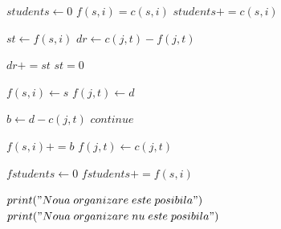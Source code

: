 \documentclass[11pt,leqno]{article}
\begin{document}
\pagebreak

\vspace{0.5cm}
\begin{algorithmic}
    \State $students \gets 0$
        \State $f(s, i) = c(s, i)$
        \State $students += c(s, i)$
    \EndFor

            \State $ st \gets f(s, i) $
            \State $ dr \gets c(j, t) - f(j, t) $

            \State $ dr += st $
            \State $ st = 0 $
            
            \State $ f(s, i) \gets s $
            \State $ f(j, t) \gets d $
            
            \State $ b \gets d - c(j, t) $
                \State $continue$
            \EndIf
 
            \State $ f(s, i) += b $
            \State $ f(j, t) \gets c(j, t) $

        \EndFor
    \EndFor
    
    $fstudents \gets 0$
        \State $fstudents += f(s, i)$
    \EndFor

        \State $print("Noua \; organizare \; este \; posibila")$
    \Else
        \State $print("Noua \; organizare \; nu \; este \; posibila")$
    \EndIf


\end{algorithmic}
\end{document}
